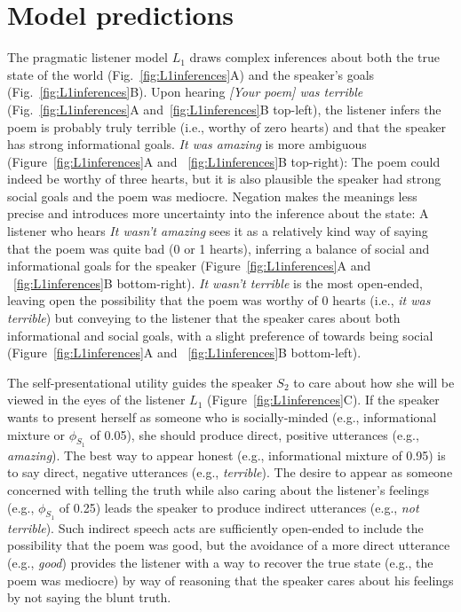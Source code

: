 \documentclass[oneside]{report}
\begin{document}
\section{Model predictions}\label{model-predictions}

The pragmatic listener model \(L_1\) draws complex inferences about both
the true state of the world (Fig.~\ref{fig:L1inferences}A) and the
speaker's goals (Fig.~\ref{fig:L1inferences}B). Upon hearing
\emph{{[}Your poem{]} was terrible} (Fig.~\ref{fig:L1inferences}A
and~\ref{fig:L1inferences}B top-left), the listener infers the poem is
probably truly terrible (i.e., worthy of zero hearts) and that the
speaker has strong informational goals. \emph{It was amazing} is more
ambiguous (Figure~\ref{fig:L1inferences}A and ~\ref{fig:L1inferences}B
top-right): The poem could indeed be worthy of three hearts, but it is
also plausible the speaker had strong social goals and the poem was
mediocre. Negation makes the meanings less precise and introduces more
uncertainty into the inference about the state: A listener who hears
\emph{It wasn't amazing} sees it as a relatively kind way of saying that
the poem was quite bad (0 or 1 hearts), inferring a balance of social
and informational goals for the speaker (Figure~\ref{fig:L1inferences}A
and ~\ref{fig:L1inferences}B bottom-right). \emph{It wasn't terrible} is
the most open-ended, leaving open the possibility that the poem was
worthy of 0 hearts (i.e., \emph{it was terrible}) but conveying to the
listener that the speaker cares about both informational and social
goals, with a slight preference of towards being social
(Figure~\ref{fig:L1inferences}A and ~\ref{fig:L1inferences}B
bottom-left).

The self-presentational utility guides the speaker \(S_2\) to care about
how she will be viewed in the eyes of the listener \(L_1\)
(Figure~\ref{fig:L1inferences}C). If the speaker wants to present
herself as someone who is socially-minded (e.g., informational mixture
or \(\phi_{S_1}\) of 0.05), she should produce direct, positive
utterances (e.g., \emph{amazing}). The best way to appear honest (e.g.,
informational mixture of 0.95) is to say direct, negative utterances
(e.g., \emph{terrible}). The desire to appear as someone concerned with
telling the truth while also caring about the listener's feelings (e.g.,
\(\phi_{S_1}\) of 0.25) leads the speaker to produce indirect utterances
(e.g., \emph{not terrible}). Such indirect speech acts are sufficiently
open-ended to include the possibility that the poem was good, but the
avoidance of a more direct utterance (e.g., \emph{good}) provides the
listener with a way to recover the true state (e.g., the poem was
mediocre) by way of reasoning that the speaker cares about his feelings
by not saying the blunt truth.
\end{document}
